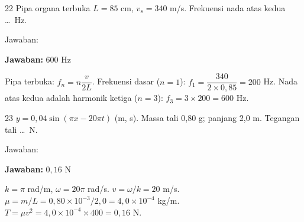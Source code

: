\documentclass[11pt]{article}
\newcommand{\jawaban}[1]{%
  \noindent\colorbox{gold!30}{\parbox{\dimexpr\linewidth-2\fboxsep\relax}{%
    \textbf{Jawaban:} #1}}\par\smallskip}
\begin{document}
\begin{soal}{22}
Pipa organa terbuka $L=85$ cm, $v_s=340$ m/s. Frekuensi nada atas kedua \ldots\ Hz.

\vspace{0.4em}\noindent Jawaban:\enspace\underline{\hspace{4cm}}
\end{soal}
\begin{pembox}
\jawaban{$600$ Hz}
Pipa terbuka: $f_n=n\dfrac{v}{2L}$. Frekuensi dasar ($n=1$):
$f_1=\dfrac{340}{2\times0{,}85}=200$ Hz.
Nada atas kedua adalah harmonik ketiga ($n=3$):
$f_3=3\times200=600$ Hz.
\end{pembox}

\begin{soal}{23}
$y=0{,}04\sin(\pi x-20\pi t)$ (m, s). Massa tali 0{,}80 g; panjang 2{,}0 m.
Tegangan tali \ldots\ N.

\vspace{0.4em}\noindent Jawaban:\enspace\underline{\hspace{4cm}}
\end{soal}
\begin{pembox}
\jawaban{$0{,}16$ N}
$k=\pi$ rad/m, $\omega=20\pi$ rad/s.
$v=\omega/k=20$ m/s.
$\mu=m/L=0{,}80\times10^{-3}/2{,}0=4{,}0\times10^{-4}$ kg/m.
$T=\mu v^2=4{,}0\times10^{-4}\times400=0{,}16$ N.
\end{pembox}
\end{document}
